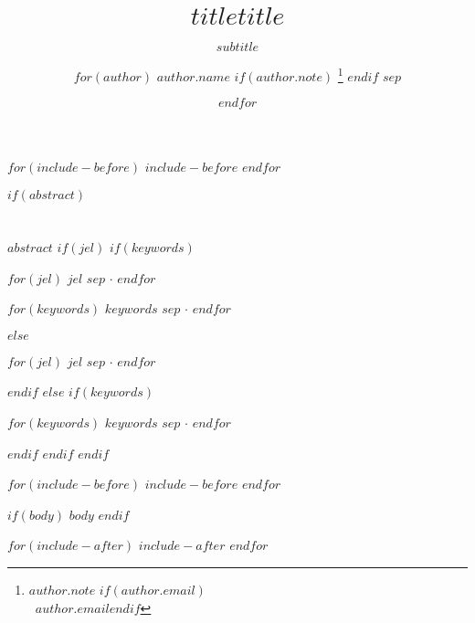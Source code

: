 \documentclass[
12pt,
a4paper,
twoside,
]{article}
\title{$title$}
\subtitle{$subtitle$}
\title{$title$}
\author{
$for(author)$
$author.name$%
$if(author.note)$
\thanks{$author.note$
$if(author.email)$\\ \faEnvelopeO \ $author.email$$endif$}
$endif$
$sep$ \and %
$endfor$}
\makeatletter
\renewenvironment{abstract}{%
\if@twocolumn
    \section*{\abstractname}%
\else
    \normalsize
    \begin{center}%
      {\sffamily\fontseries{sb}\scshape \abstractname\vspace{-.5em}\vspace{\z@}}%
    \end{center}%
\fi}
\makeatother
\begin{document}
$for(include-before)$
$include-before$
$endfor$

\maketitle

\thispagestyle{empty}

$if(abstract)$
\begin{abstract}
  \quotation
  \small \selectfont \noindent $abstract$
  $if(jel)$
  $if(keywords)$
  \vspace{1ex}
  \begin{description}[font=\sffamily\fontseries{sb}\scshape, itemsep=1ex]
    \item[JEL Classification:] $for(jel)$ $jel$ $sep$ \( \cdot \) $endfor$
    \item[Keywords:] $for(keywords)$ $keywords$ $sep$ \( \cdot \) $endfor$
  \end{description}
  $else$
  \vspace{1ex}
  \begin{description}[font=\sffamily\fontseries{sb}\scshape, itemsep=1ex]
    \item[JEL Classification:] $for(jel)$ $jel$ $sep$ \( \cdot \) $endfor$
  \end{description}
  $endif$
  $else$
  $if(keywords)$
  \vspace{1ex}
  \begin{description}[font=\sffamily\fontseries{sb}\scshape, itemsep=1ex]
    \item[Keywords:] $for(keywords)$ $keywords$ $sep$ \( \cdot \) $endfor$
  \end{description}
  $endif$
  $endif$
  \endquotation
\end{abstract}
$endif$

$for(include-before)$
$include-before$
$endfor$

\clearpage

$if(body)$
$body$
$endif$

\clearpage



$for(include-after)$
$include-after$
$endfor$
\end{document}
